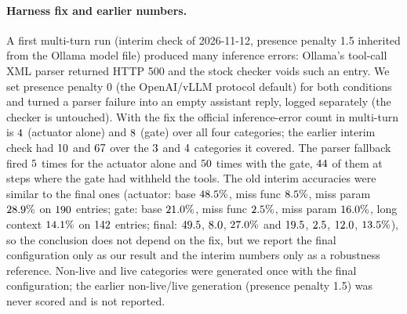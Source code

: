\documentclass[10pt,twocolumn,letterpaper]{article}
\begin{document}
\paragraph{Harness fix and earlier numbers.} A first multi-turn run (interim check of 2026-11-12, presence penalty 1.5 inherited from the Ollama model file) produced many inference errors: Ollama's tool-call XML parser returned HTTP 500 and the stock checker voids such an entry. We set presence penalty 0 (the OpenAI/vLLM protocol default) for both conditions and turned a parser failure into an empty assistant reply, logged separately (the checker is untouched). With the fix the official inference-error count in multi-turn is $4$ (actuator alone) and $8$ (gate) over all four categories; the earlier interim check had $10$ and $67$ over the $3$ and $4$ categories it covered. The parser fallback fired $5$ times for the actuator alone and $50$ times with the gate, $44$ of them at steps where the gate had withheld the tools. The old interim accuracies were similar to the final ones (actuator: base $48.5\%$, miss func $8.5\%$, miss param $28.9\%$ on $190$ entries; gate: base $21.0\%$, miss func $2.5\%$, miss param $16.0\%$, long context $14.1\%$ on $142$ entries; final: $49.5$, $8.0$, $27.0\%$ and $19.5$, $2.5$, $12.0$, $13.5\%$), so the conclusion does not depend on the fix, but we report the final configuration only as our result and the interim numbers only as a robustness reference. Non-live and live categories were generated once with the final configuration; the earlier non-live/live generation (presence penalty 1.5) was never scored and is not reported.

\begin{table}[t]
\centering
\scriptsize
\setlength{\tabcolsep}{4pt}
\caption{Official BFCL v4 on a local Qwen3.5-9B actuator with and without the GNCA respond gate, one run per condition, presence penalty 0. $p$: two-sided exact McNemar test on the entries where exactly one condition is correct (unadjusted). $^a$ Multi-turn: official \texttt{inference\_error}; other categories: requests that timed out (recorded in the result file). $^b$ Official \texttt{empty\_turn\_model\_response} (multi-turn only). $^c$ Decision steps in which the gate withheld the tools (entries with at least one such step). Memory rows count the three backends separately. All values are generated from the official score files.}
\label{tab:bfcl-official}

\end{table}
\end{document}
